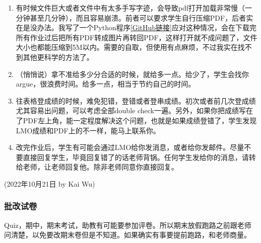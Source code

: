 \begin{enumerate}
    \item 有时候文件巨大或者文件中有太多手写字迹，会导致pdf打开加载非常慢（一分钟甚至几分钟），而且容易崩溃。前者可以要求学生自行压缩PDF，后者实在是没办法。我写了一个Python程序\href{https://github.com/kaiwu-astro/xp_pgrs_unofficial_guide/tree/main/fileshare/pdf_to_png_to_pdf.py}{[GitHub链接]}应对这种情况，会在下载完所有作业过后把所有PDF转成图片再转回PDF，这样打开就不成问题了，文件大小也都能压缩到5M以内。需要的自取，但使用有点麻烦，不过我实在找不到其他更科学的方法了。
    \item （悄悄说）拿不准给多少分合适的时候，就给多一点。给少了，学生会找你argue，很浪费时间。给多一点，相当于节约自己的时间。
    \item 往表格登成绩的时候，难免犯错，登错或者登串成绩。初次或者前几次登成绩尤其容易出问题，可以考虑全部double check一遍。另外，如果你把成绩写在了PDF左上角，能一定程度解决这个问题，也就是如果成绩登错了，学生发现LMO成绩和PDF上的不一样，能马上联系你。
    \item 改完作业后，学生有可能会通过LMO给你发消息，或者给你发邮件。尽量不要直接回复学生，毕竟回复错了的话老师背锅。任何学生发给你的消息，请转给老师，让老师回复他。除非老师同意你直接回复。
\end{enumerate}

\begin{flushright}
    (2022年10月21日 by Kai Wu)
\end{flushright}

\subsubsection{批改试卷}
Quiz，期中，期末考试，助教有可能要参加评卷。所以期末放假跑路之前跟老师问清楚，以免要改期末卷但是不知道。如果确实有事要提前跑路，和老师商量。

